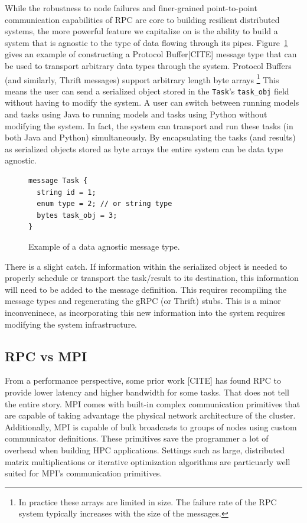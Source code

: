 \documentclass[conference]{IEEEtran}
\begin{document}
While the robustness to node failures and finer-grained point-to-point
communication capabilities of RPC are core to building resilient
distributed systems, the more powerful feature we capitalize on is
the ability to build a system that is agnostic to the type of data
flowing through its pipes. Figure~\ref{fig:data-agnostic} gives an example
of constructing a Protocol Buffer[CITE] message type that can be used to
transport arbitrary data types through the system. Protocol Buffers (and
similarly, Thrift messages) support arbitrary length byte arrays
\footnote{In practice
  these arrays are limited in size. The failure rate of the RPC system
  typically increases with the size of the messages.} This means the
user can send a serialized object stored in the \texttt{Task}'s
\texttt{task\_obj} field without having to modify the system.
A user can switch between running models and tasks using Java to running
models and tasks using Python without modifying the system. In fact,
the system can transport and run these tasks (in both Java and Python)
simultaneously. By encapsulating the tasks (and results) as serialized
objects stored as byte arrays the entire system can be data type
agnostic.

\begin{figure}
  \begin{lstlisting}
message Task {
  string id = 1;
  enum type = 2; // or string type
  bytes task_obj = 3;
}
  \end{lstlisting}
  \caption{Example of a data agnostic message type.}\label{fig:data-agnostic}
\end{figure}

There is a slight catch. If information within the serialized object
is needed to properly schedule or transport the task/result to its
destination, this information will need to be added to the message
definition. This requires recompiling the message types and regenerating
the gRPC (or Thrift) stubs. This is a minor inconveninece, as incorporating
this new information into the system requires modifying the system
infrastructure.

\subsection{RPC vs MPI}
From
a performance perspective, some prior work [CITE] has found RPC to provide lower
latency and higher bandwidth for some tasks. That does not tell the entire
story. MPI comes with built-in complex communication primitives that are capable
of taking advantage the physical network architecture of the
cluster. Additionally, MPI is capable of bulk broadcasts to groups of nodes
using custom communicator definitions. These primitives save the programmer a
lot of overhead when building HPC applications. Settings such as large,
distributed matrix multiplications or iterative optimization algorithms are
particuarly well suited for MPI's communication primitives.
\end{document}
